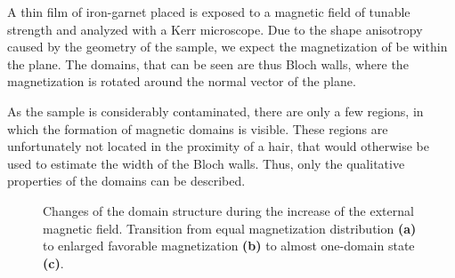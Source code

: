 \documentclass[a4paper]{scrartcl}
\numberwithin{equation}{section}
\numberwithin{figure}{section}
\numberwithin{table}{section}
\begin{document}
A thin film of iron-garnet placed is exposed to a magnetic field of tunable strength and analyzed with a Kerr microscope. Due to the shape anisotropy caused by the geometry of the sample, we expect the magnetization of be within the plane. The domains, that can be seen are thus Bloch walls, where the magnetization is rotated around the normal vector of the plane. 

As the sample is considerably contaminated, there are only a few regions, in which the formation of magnetic domains is visible. These regions are unfortunately not located in the proximity of a hair, that would otherwise be used to estimate the width of the Bloch walls. Thus, only the qualitative properties of the domains can be described.


\begin{figure} 
 \centering
{} \hfill
{} \hfill
{} \hfill
\caption{ Changes of the domain structure during the increase of the external magnetic field. Transition from equal magnetization distribution \textbf{(a)} to enlarged favorable magnetization \textbf{(b)} to almost one-domain state \textbf{(c)}.
\small  } 
	\label{fig:domains}
\end{figure}
\end{document}
